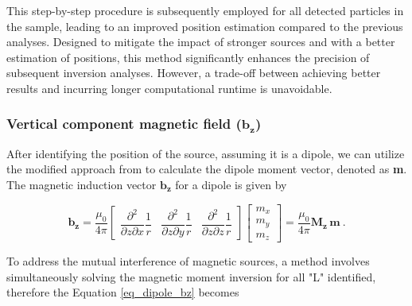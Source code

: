 This step-by-step procedure is subsequently employed for all detected particles in the sample, leading to an improved position estimation compared to the previous analyses. Designed to mitigate the impact of stronger sources and with a better estimation of positions, this method significantly enhances the precision of subsequent inversion analyses. However, a trade-off between achieving better results and incurring longer computational runtime is unavoidable. 



\subsubsection{Vertical component magnetic field ($\mathbf{b_z}$)}\label{section_bz}
After identifying the position of the source, assuming it is a dipole, we can utilize the modified approach from \citet{Oliveira2015Estimation} to calculate the dipole moment vector, denoted as 
\textbf{m}. The magnetic induction vector $\mathbf{b_z}$ for a dipole is given by

\begin{equation}
\label{eq_dipole_bz}
\mathbf{b_z}
= \dfrac{\mu_0}{4\pi}
\begin{bmatrix}
\dfrac{\partial^2}{\partial z \partial x} \dfrac{1}{r}
& \dfrac{\partial^2}{\partial z \partial y} \dfrac{1}{r}
& \dfrac{\partial^2}{\partial z \partial z} \dfrac{1}{r}
\end{bmatrix}
\begin{bmatrix}
m_x \\ m_y \\ m_z
\end{bmatrix}
= \dfrac{\mu_0}{4\pi} \mathbf{M_z}\,\mathbf{m}
\ .
\end{equation}

To address the mutual interference of magnetic sources, a method involves simultaneously solving the magnetic moment inversion for all "L" identified, therefore the Equation \ref{eq_dipole_bz} becomes


